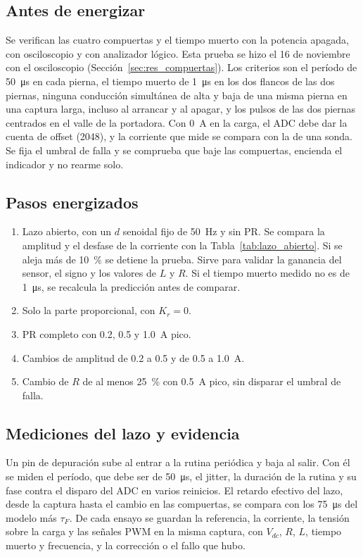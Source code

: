 \documentclass[journal]{IEEEtran}
\begin{document}
\subsection{Antes de energizar}
Se verifican las cuatro compuertas y el tiempo muerto con la potencia apagada, con osciloscopio y con analizador lógico. Esta prueba se hizo el 16 de noviembre con el osciloscopio (Sección~\ref{sec:res_compuertas}). Los criterios son el período de \SI{50}{\micro s} en cada pierna, el tiempo muerto de \SI{1}{\micro s} en los dos flancos de las dos piernas, ninguna conducción simultánea de alta y baja de una misma pierna en una captura larga, incluso al arrancar y al apagar, y los pulsos de las dos piernas centrados en el valle de la portadora. Con \SI{0}{A} en la carga, el ADC debe dar la cuenta de offset (\num{2048}), y la corriente que mide se compara con la de una sonda. Se fija el umbral de falla y se comprueba que baje las compuertas, encienda el indicador y no rearme solo.

\subsection{Pasos energizados}
\begin{enumerate}
	\item Lazo abierto, con un $d$ senoidal fijo de \SI{50}{Hz} y sin PR. Se compara la amplitud y el desfase de la corriente con la Tabla~\ref{tab:lazo_abierto}. Si se aleja más de \SI{10}{\percent} se detiene la prueba. Sirve para validar la ganancia del sensor, el signo y los valores de $L$ y $R$. Si el tiempo muerto medido no es de \SI{1}{\micro s}, se recalcula la predicción antes de comparar.
	\item Solo la parte proporcional, con $K_r=0$.
	\item PR completo con \num{0.2}, \num{0.5} y \SI{1.0}{A} pico.
	\item Cambios de amplitud de \num{0.2} a \num{0.5} y de \num{0.5} a \SI{1.0}{A}.
	\item Cambio de $R$ de al menos \SI{25}{\percent} con \SI{0.5}{A} pico, sin disparar el umbral de falla.
\end{enumerate}

\subsection{Mediciones del lazo y evidencia}
Un pin de depuración sube al entrar a la rutina periódica y baja al salir. Con él se miden el período, que debe ser de \SI{50}{\micro s}, el jitter, la duración de la rutina y su fase contra el disparo del ADC en varios reinicios. El retardo efectivo del lazo, desde la captura hasta el cambio en las compuertas, se compara con los \SI{75}{\micro s} del modelo más $\tau_F$. De cada ensayo se guardan la referencia, la corriente, la tensión sobre la carga y las señales PWM en la misma captura, con $V_{dc}$, $R$, $L$, tiempo muerto y frecuencia, y la corrección o el fallo que hubo.
\end{document}
